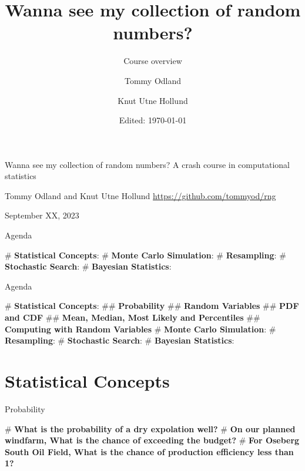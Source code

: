 \documentclass[12pt, aspectratio=149]{beamer}
\institute{Equinor}
\date{Edited: \today}
\author{Tommy Odland \and Knut Utne Hollund}
\title{Wanna see my collection of random numbers?}
\subtitle{Course overview}
\theoremstyle{plain}
\begin{document}
\begin{frame}{}
	\begin{center}
			\vfill
	{\huge Wanna see my collection of random numbers?}
	\vfill
	{\large A crash course in computational statistics}
	\vfill
	

	\vfill
	{\large  Tommy Odland and Knut Utne Hollund}
	\vfill
	{\small \href{https://github.com/tommyod/rng}{https://github.com/tommyod/rng}}

	\vfill
	September XX, 2023
	\vfill
	\end{center}
\end{frame}

\begin{frame}[fragile]{Agenda}
	\begin{center}
	\end{center}
	
	\begin{easylist}[itemize]
		# \textbf{Statistical Concepts}: 
		# \textbf{Monte Carlo Simulation}: 
		# \textbf{Resampling}: 
		# \textbf{Stochastic Search}: 
		# \textbf{Bayesian Statistics}: 
	\end{easylist}
\end{frame}

\begin{frame}[fragile]{Agenda}
	\begin{easylist}[itemize]
		# \textbf{Statistical Concepts}: 
		##	\textbf{Probability} 
		##	\textbf{Random Variables} 
		##	\textbf{PDF and CDF}
		##	\textbf{Mean, Median, Most Likely and Percentiles}
		##	\textbf{Computing with Random Variables}
		# \textbf{Monte Carlo Simulation}: 
		# \textbf{Resampling}: 
		# \textbf{Stochastic Search}: 
		# \textbf{Bayesian Statistics}: 
	\end{easylist}
\end{frame}

\section{Statistical Concepts}

\begin{frame}[fragile]{Probability}
	
	\begin{easylist}[itemize]
		# \textbf{What is the probability of a dry expolation well?}
		# \textbf{On our planned windfarm, What is the chance of exceeding the budget?}
		# \textbf{For Oseberg South Oil Field, What is the chance of production efficiency less than 1?}
	\end{easylist}
\end{frame}
\end{document}
